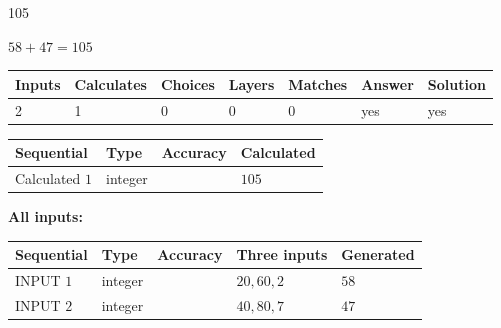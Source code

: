 \documentclass[12pt]{article}
\begin{document}
 

105
 
 
\noindent{}
 
 

 
 
 
\noindent{}
 
 

$ %
58 +  %
47=   %
105$
 
 
\noindent{}
 
 

 
   
   
   
   
\noindent\begin{tabular}{|l|l|l|l|l|l|l|}
 \hline
Inputs & Calculates & Choices & Layers & Matches & Answer & Solution \\ \hline
 2  & 
 1  & 
 0
  & 
 0  & 
 0  & 
  yes & 
  yes 
  \\ \hline
 \end{tabular}
   
   
   
   
\noindent{}
   
   
  
  
\noindent\begin{tabular}{|l|l|l|l|}
\hline
 Sequential & Type & Accuracy & Calculated \\ 
\hline
 
 
  Calculated $  1 $ & integer &  & 
  $ 105 $ 
 \\  \hline  
 \end{tabular}
   
   
   
   
\noindent\vspace{0.1in}\hspace{-0.08in} {\textbf{\Large{All inputs: }}}
   
   
  
  
\noindent\begin{tabular}{|l|l|l|l|l|}
\hline
 Sequential & Type & Accuracy & Three inputs & Generated \\ 
\hline
 
 
  INPUT $  1 $ & integer &  & $
 20
 , 
 60
 , 
 2
 $ & $ 58 $ 
 \\  \hline  
 
 
  INPUT $  2 $ & integer &  & $
 40
 , 
 80
 , 
 7
 $ & $ 47 $ 
 \\  \hline  
 \end{tabular}
   
\end{document}
